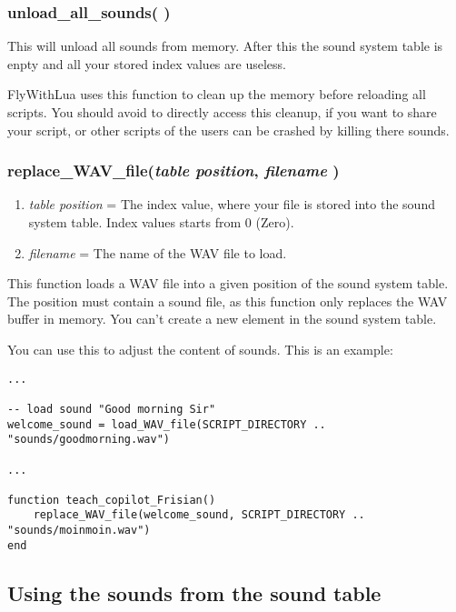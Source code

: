 \documentclass[11pt,parskip=half,a4paper]{scrartcl}
\begin{document}
\subsubsection{ unload\_all\_sounds( )}

This will unload all sounds from memory. After this the sound system table is enpty and all your stored index values are useless.

FlyWithLua uses this function to clean up the memory before reloading all scripts. You should avoid to directly access this cleanup, if you want to share your script, or other scripts of the users can be crashed by killing there sounds.

\subsubsection{ replace\_WAV\_file(\emph{table position}, \emph{filename} )}

\begin{enumerate}
	\item \emph{table position} = The index value, where your file is stored into the sound system table. Index values starts from 0 (Zero).
	\item \emph{filename} = The name of the WAV file to load.
\end{enumerate}

This function loads a WAV file into a given position of the sound system table. The position must contain a sound file, as this function only replaces the WAV buffer in memory. You can't create a new element in the sound system table.

You can use this to adjust the content of sounds. This is an example:

\begin{lstlisting}
...

-- load sound "Good morning Sir"
welcome_sound = load_WAV_file(SCRIPT_DIRECTORY .. "sounds/goodmorning.wav")

...

function teach_copilot_Frisian()
    replace_WAV_file(welcome_sound, SCRIPT_DIRECTORY .. "sounds/moinmoin.wav")
end
\end{lstlisting}




\newpage
\subsection{Using the sounds from the sound table}
\end{document}
